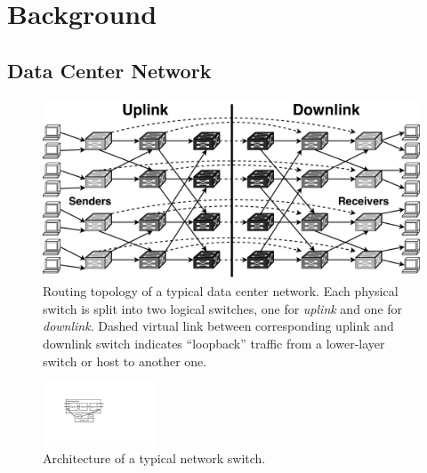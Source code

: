 \section{Background}
\label{sec:background}

\subsection{Data Center Network}
\label{sec:dcn}




\begin{figure}[t]
\centering
\includegraphics[width=.45\textwidth]{images/dcn_dag.pdf}
\caption{
	Routing topology of a typical data center network.
	Each physical switch is split into two logical switches, one for \textit{uplink} and one for \textit{downlink}.
    Dashed virtual link between corresponding uplink and downlink switch indicates ``loopback'' traffic from a lower-layer switch or host to another one.
}
\label{fig:dcn}
\end{figure}

\begin{figure}[t]
\centering
\includegraphics[width=0.3\textwidth]{images/cropped_switch_architecture.pdf}
\caption{Architecture of a typical network switch.}
\label{fig:switch}
\end{figure}


